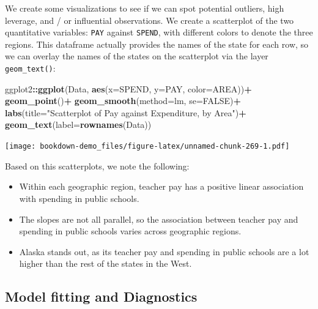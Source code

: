\documentclass[
]{book}
\newenvironment{Shaded}{\begin{snugshade}}{\end{snugshade}}
\newcommand{\AttributeTok}[1]{\textcolor[rgb]{0.13,0.29,0.53}{#1}}
\newcommand{\ConstantTok}[1]{\textcolor[rgb]{0.56,0.35,0.01}{#1}}
\newcommand{\FunctionTok}[1]{\textcolor[rgb]{0.13,0.29,0.53}{\textbf{#1}}}
\newcommand{\NormalTok}[1]{#1}
\newcommand{\SpecialCharTok}[1]{\textcolor[rgb]{0.81,0.36,0.00}{\textbf{#1}}}
\newcommand{\StringTok}[1]{\textcolor[rgb]{0.31,0.60,0.02}{#1}}
\providecommand{\tightlist}{%
  \setlength{\itemsep}{0pt}\setlength{\parskip}{0pt}}
\begin{document}
We create some visualizations to see if we can spot potential outliers, high leverage, and / or influential observations. We create a scatterplot of the two quantitative variables: \texttt{PAY} against \texttt{SPEND}, with different colors to denote the three regions. This dataframe actually provides the names of the state for each row, so we can overlay the names of the states on the scatterplot via the layer \texttt{geom\_text()}:

\begin{Shaded}
\begin{Highlighting}[]
\NormalTok{ggplot2}\SpecialCharTok{::}\FunctionTok{ggplot}\NormalTok{(Data, }\FunctionTok{aes}\NormalTok{(}\AttributeTok{x=}\NormalTok{SPEND, }\AttributeTok{y=}\NormalTok{PAY, }\AttributeTok{color=}\NormalTok{AREA))}\SpecialCharTok{+}
  \FunctionTok{geom\_point}\NormalTok{()}\SpecialCharTok{+}
  \FunctionTok{geom\_smooth}\NormalTok{(}\AttributeTok{method=}\NormalTok{lm, }\AttributeTok{se=}\ConstantTok{FALSE}\NormalTok{)}\SpecialCharTok{+}
  \FunctionTok{labs}\NormalTok{(}\AttributeTok{title=}\StringTok{"Scatterplot of Pay against Expenditure, by Area"}\NormalTok{)}\SpecialCharTok{+}
  \FunctionTok{geom\_text}\NormalTok{(}\AttributeTok{label=}\FunctionTok{rownames}\NormalTok{(Data))}
\end{Highlighting}
\end{Shaded}

\texttt{[image: bookdown-demo\_files/figure-latex/unnamed-chunk-269-1.pdf]}

Based on this scatterplots, we note the following:

\begin{itemize}
\tightlist
\item
  Within each geographic region, teacher pay has a positive linear association with spending in public schools.
\item
  The slopes are not all parallel, so the association between teacher pay and spending in public schools varies across geographic regions.
\item
  Alaska stands out, as its teacher pay and spending in public schools are a lot higher than the rest of the states in the West.
\end{itemize}

\hypertarget{model-fitting-and-diagnostics}{%
\subsection*{Model fitting and Diagnostics}\label{model-fitting-and-diagnostics}}
\end{document}
